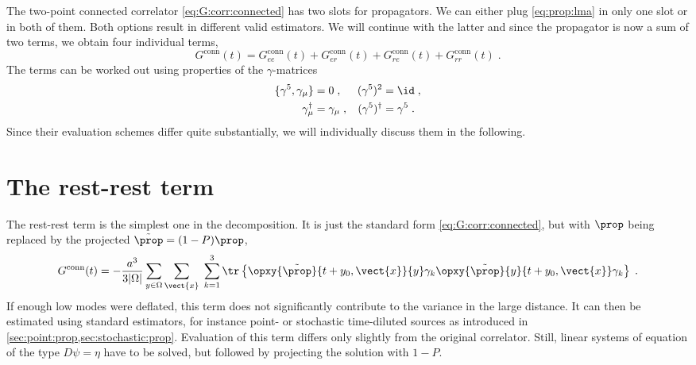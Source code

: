 The two-point connected correlator \cref{eq:G:corr:connected} has two slots for propagators.
We can either plug \cref{eq:prop:lma} in only one slot or in both of them.
Both options result in different valid estimators.
We will continue with the latter and since the propagator is now a sum of two terms, we obtain four individual terms,
\begin{equation}
G^{\text{conn}}(t)
= G_{ee}^{\text{conn}}(t)
+ G_{er}^{\text{conn}}(t)
+ G_{re}^{\text{conn}}(t)
+ G_{rr}^{\text{conn}}(t) \;.
\end{equation}
The terms can be worked out using properties of the $\gamma$-matrices
\begin{align}
\{\gamma^{5}, \gamma_{\mu}\} &= 0 \;,        &  (\gamma^{5})^{2} &= \id \;, \\
\gamma_{\mu}^{\dagger} &= \gamma_{\mu} \;,   &  (\gamma^{5})^{\dagger} &= \gamma^{5} \;.
\end{align}
Since their evaluation schemes differ quite substantially, we will individually discuss them in the following.

\section{The rest-rest term}
\label{sec:lma:rr}

The rest-rest term is the simplest one in the decomposition.
It is just the standard form \cref{eq:G:corr:connected}, but with $\prop$ being replaced by the projected $\tilde{\prop} = (1-P)\prop$,
\begin{equation}
G^{\text{conn}}(t) =
- \frac{a^{3}}{3 \lvert \Omega \rvert}
\sum_{y \in \Omega}
\sum_{\vect{x}} \;
\sum_{k=1}^{3}
\tr \left\{
  \opxy{\tilde{\prop}}{t+y_0, \vect{x}}{y} \gamma_k \opxy{\tilde{\prop}}{y}{t+y_0, \vect{x}} \gamma_k
\right\} \;.
\end{equation}
If enough low modes were deflated, this term does not significantly contribute to the variance in the large distance.
It can then be estimated using standard estimators, for instance point- or stochastic time-diluted sources as introduced in \cref{sec:point:prop,sec:stochastic:prop}.
Evaluation of this term differs only slightly from the original correlator.
Still, linear systems of equation of the type $D \psi = \eta$ have to be solved, but followed by projecting the solution with $1-P$.

